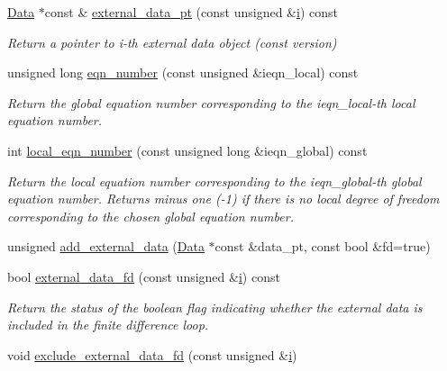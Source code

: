 \begin{DoxyCompactItemize}
\hyperlink{classoomph_1_1Data}{Data} $\ast$const  \& \hyperlink{classoomph_1_1GeneralisedElement_a59570d8174b7123613d8cbfe6957a21c}{external\+\_\+data\+\_\+pt} (const unsigned \&\hyperlink{cfortran_8h_adb50e893b86b3e55e751a42eab3cba82}{i}) const
\begin{DoxyCompactList}\small\item\em Return a pointer to i-\/th external data object (const version) \end{DoxyCompactList}\item 
unsigned long \hyperlink{classoomph_1_1GeneralisedElement_a37ac5a1d5234fa931ab710c0c74d55d2}{eqn\+\_\+number} (const unsigned \&ieqn\+\_\+local) const
\begin{DoxyCompactList}\small\item\em Return the global equation number corresponding to the ieqn\+\_\+local-\/th local equation number. \end{DoxyCompactList}\item 
int \hyperlink{classoomph_1_1GeneralisedElement_a3d46b71d27f94aeba21aff1ef84fd0a6}{local\+\_\+eqn\+\_\+number} (const unsigned long \&ieqn\+\_\+global) const
\begin{DoxyCompactList}\small\item\em Return the local equation number corresponding to the ieqn\+\_\+global-\/th global equation number. Returns minus one (-\/1) if there is no local degree of freedom corresponding to the chosen global equation number. \end{DoxyCompactList}\item 
unsigned \hyperlink{classoomph_1_1GeneralisedElement_afc58b505360aa5d172e50baad9aae46d}{add\+\_\+external\+\_\+data} (\hyperlink{classoomph_1_1Data}{Data} $\ast$const \&data\+\_\+pt, const bool \&fd=true)
\item 
bool \hyperlink{classoomph_1_1GeneralisedElement_a34e8a59703e2b223406112525104034c}{external\+\_\+data\+\_\+fd} (const unsigned \&\hyperlink{cfortran_8h_adb50e893b86b3e55e751a42eab3cba82}{i}) const
\begin{DoxyCompactList}\small\item\em Return the status of the boolean flag indicating whether the external data is included in the finite difference loop. \end{DoxyCompactList}\item 
void \hyperlink{classoomph_1_1GeneralisedElement_af67b6dd1e2d93449e5a898d9b02df605}{exclude\+\_\+external\+\_\+data\+\_\+fd} (const unsigned \&\hyperlink{cfortran_8h_adb50e893b86b3e55e751a42eab3cba82}{i})

\end{DoxyCompactItemize}

